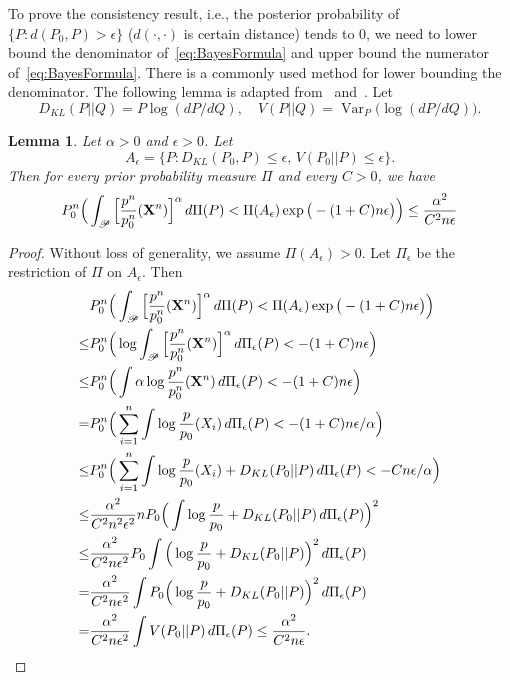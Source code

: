 \documentclass[11pt, letterpaper]{article}
\DeclareMathOperator{\myVar}{Var}
\theoremstyle{plain}
\newtheorem{lemma}{\quad\quad Lemma}
\theoremstyle{definition}
\theoremstyle{remark}
\begin{document}
To prove the consistency result, i.e., the posterior probability of $\{P:d(P_0, P)>\epsilon\}$ ($d(\cdot,\cdot)$ is certain distance) tends to $0$, we need to lower bound the denominator of~\eqref{eq:BayesFormula} and upper bound the numerator of~\eqref{eq:BayesFormula}.
There is a commonly used method for lower bounding the denominator.
The following lemma is adapted from~\cite{ghosal2000} and~\cite{Shen2001Rates}.
Let 
$$D_{KL}(P||Q)=P\log ({dP}/{dQ}),\quad V(P||Q)=\myVar_P \big(\log(dP/dQ)\big).$$
\begin{lemma}\label{lemma:denominator}
    Let $\alpha>0$ and $\epsilon>0$.
    Let 
    $$A_\epsilon=\{ P:  D_{KL}(P_0, P)\leq \epsilon,\, V(P_0||P)\leq \epsilon\}.$$
Then for every prior probability measure $\Pi$ and every $C>0$, we have
$$
    P_0^n\Big(
    \int_{\mathscr{P}} \Big[\frac{p^n}{p^n_0} (\mathbf{X}^n ) \Big]^\alpha \, d \Pi(P)
    <
    \Pi(A_\epsilon)
    \exp\big(-(1+C)n\epsilon\big)
    \Big)\leq \frac{\alpha^2}{C^2 n \epsilon}    
$$
\end{lemma}
\begin{proof}
    Without loss of generality, we assume $\Pi(A_{\epsilon})>0$.
    Let $\Pi_{\epsilon}$ be the restriction of $\Pi$ on $A_{\epsilon}$.
    Then
$$
    \begin{aligned}
        &P_0^n\Big(
        \int_{\mathscr{P}} \Big[\frac{p^n}{p^n_0} (\mathbf{X}^n)\Big]^\alpha \, d \Pi(P)
    <
    \Pi(A_\epsilon)
    \exp\big(-(1+C)n\epsilon\big)
    \Big)\\
        \leq &
    P_0^n\Big(
        \log \int_{\mathscr{P}} \Big[\frac{p^n}{p^n_0} (\mathbf{X}^n)\Big]^\alpha \, d \Pi_\epsilon (P)
    <
    -(1+C)n\epsilon\Big)\\
        \leq &
    P_0^n\Big(
     \int \alpha \log \frac{p^n}{p^n_0} (\mathbf{X}^n) \, d \Pi_\epsilon (P)
    <
    -(1+C)n\epsilon\Big)\\
        = &
    P_0^n\Big(
        \sum_{i=1}^n \int \log \frac{p}{p_0} (X_i) \, d \Pi_\epsilon (P)
    <
    -(1+C)n\epsilon/\alpha\Big)\\
        \leq &
    P_0^n\Big(
        \sum_{i=1}^n \int \log \frac{p}{p_0} (X_i) +  D_{KL}(P_0||P)\, d \Pi_\epsilon (P)
    <
    -Cn\epsilon/\alpha\Big)\\
        \leq &
        \frac{\alpha^2}{C^2 n^2 \epsilon^2}
        {n}
        P_0 \Big( \int \log \frac{p}{p_0}  +  D_{KL}(P_0 || P)\, d\Pi_\epsilon (P)  \Big)^2\\
        \leq &
        \frac{\alpha^2}{C^2 n \epsilon^2}
        P_0  \int \Big(\log \frac{p}{p_0}  +  D_{KL}(P_0 || P)\Big)^2\, d\Pi_\epsilon (P)  \\
        = &
        \frac{\alpha^2}{C^2 n \epsilon^2}
          \int P_0\Big(\log \frac{p}{p_0}  +  D_{KL}(P_0 || P)\Big)^2\, d\Pi_\epsilon (P)  \\
        = &
        \frac{\alpha^2}{C^2 n \epsilon^2}
          \int V(P_0|| P)\, d\Pi_\epsilon (P)  
        \leq 
        \frac{\alpha^2}{C^2 n \epsilon}.
    \end{aligned}
$$
\end{proof}
\end{document}
